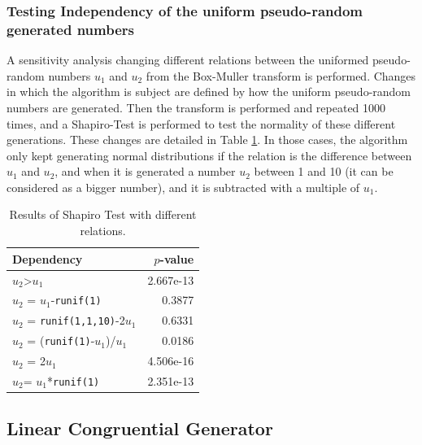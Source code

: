 \documentclass[10pt,leter,openany]{article}
\begin{document}
		\vspace{0.7cm}
		

	\subsubsection{Testing Independency of the uniform pseudo-random generated numbers}

		A sensitivity analysis changing different relations between the uniformed pseudo-random numbers $ u_{1} $ and $ u_{2} $ from the Box-Muller transform is performed. Changes in which the algorithm is subject are defined by how the uniform pseudo-random numbers are generated. Then the transform is performed and repeated 1000 times, and a Shapiro-Test is performed to test the normality of these different generations. These changes are detailed in Table \ref{tab:dep}. In those cases, the algorithm only kept generating normal distributions if the relation is the difference between $ u_{1}$ and $ u_{2} $, and when it is generated a number $ u_{2} $ between 1 and 10 (it can be considered as a bigger number), and it is subtracted with a multiple of $u_{1}$.


		\begin{table}[]
			\centering
			\caption{Results of Shapiro Test with different relations.}
			\label{tab:dep}
			\begin{tabular}{@{}lr@{}}
				\toprule
				Dependency                     & $ p $-value   \\ \midrule
				$ u_{2} $\textgreater{}$u_{1}$             & 2.667e-13 \\
				$ u_{2} $ = $u_{1}$-\texttt{runif(1)}               & 0.3877    \\
				$ u_{2} $ = \texttt{runif(1,1,10)}-2$u_{1}$ & 0.6331    \\
				$ u_{2} $ = (\texttt{runif(1)}-$u_{1}$)/$u_{1}$          & 0.0186    \\
				$ u_{2} $ = 2$u_{1}$                     & 4.506e-16 \\
				$ u_{2} $= $u_{1}$*\texttt{runif(1)}               & 2.351e-13 \\ \bottomrule
			\end{tabular}
		\end{table}

	\subsection{Linear Congruential Generator}
\end{document}
